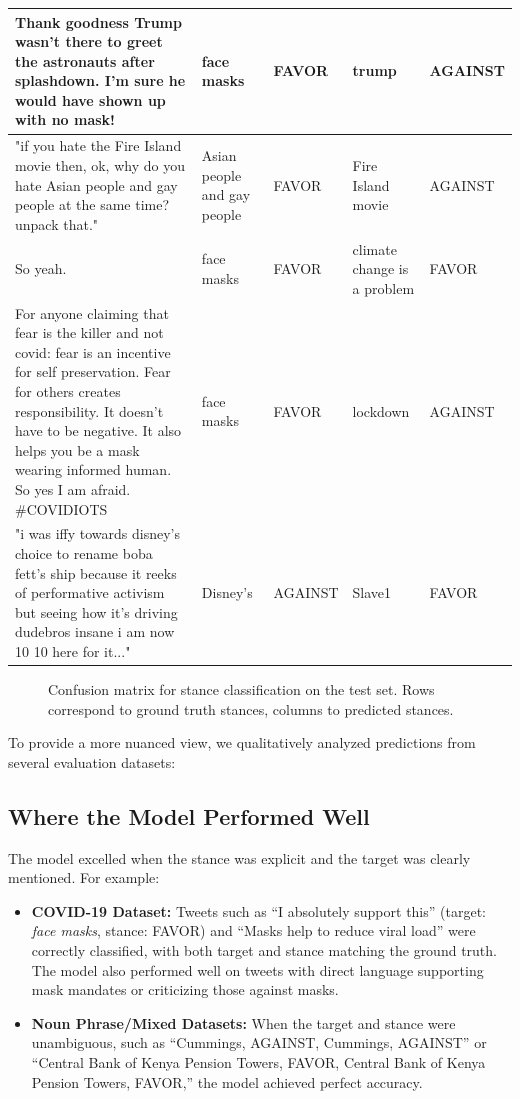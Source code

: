 \documentclass[twocolumn,11pt,letterpaper]{article}
\begin{document}
\begin{table}[!htbp]
\begin{minipage}{0.98\textwidth}
\begin{tabular}{|p{}|p{}|p{}|p{}|p{}|}
    \hline
    Thank goodness Trump wasn't there to greet the astronauts after splashdown. I'm sure he would have shown up with no mask! & face masks & FAVOR & trump & AGAINST \\
    \hline
    "if you hate the Fire Island movie then, ok, why do you hate Asian people and gay people at the same time? unpack that." & Asian people and gay people & FAVOR & Fire Island movie & AGAINST \\
    \hline
    So yeah. & face masks & FAVOR & climate change is a problem & FAVOR \\
    \hline
    For anyone claiming that fear is the killer and not covid: fear is an incentive for self preservation. Fear for others creates responsibility. It doesn't have to be negative. It also helps you be a mask wearing informed human. So yes I am afraid. #COVIDIOTS & face masks & FAVOR & lockdown & AGAINST \\
    \hline
    "i was iffy towards disney's choice to rename boba fett's ship because it reeks of performative activism but seeing how it's driving dudebros insane i am now 10 10 here for it..." & Disney's & AGAINST & Slave1 & FAVOR \\
    \hline
    \end{tabular}
    \end{minipage}
\end{table}

\begin{figure}[htbp]
    \centering
    
    \caption{Confusion matrix for stance classification on the test set. Rows correspond to ground truth stances, columns to predicted stances.}
    \label{fig:confusion_matrix}
    \end{figure}
To provide a more nuanced view, we qualitatively analyzed predictions from several evaluation datasets:

\subsection*{Where the Model Performed Well}
The model excelled when the stance was explicit and the target was clearly mentioned. For example:
\begin{itemize}
    \item \textbf{COVID-19 Dataset:} Tweets such as ``I absolutely support this'' (target: \textit{face masks}, stance: FAVOR) and ``Masks help to reduce viral load'' were correctly classified, with both target and stance matching the ground truth. The model also performed well on tweets with direct language supporting mask mandates or criticizing those against masks.
    \item \textbf{Noun Phrase/Mixed Datasets:} When the target and stance were unambiguous, such as ``Cummings, AGAINST, Cummings, AGAINST'' or ``Central Bank of Kenya Pension Towers, FAVOR, Central Bank of Kenya Pension Towers, FAVOR,'' the model achieved perfect accuracy.
\end{itemize}
\end{document}
